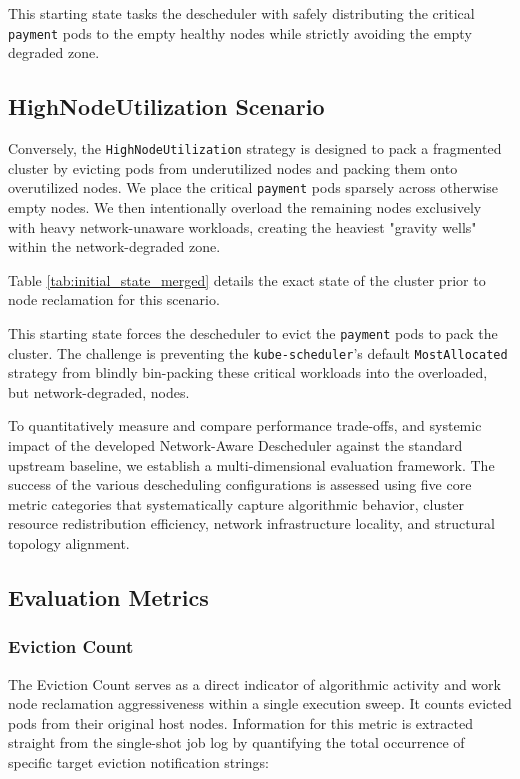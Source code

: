 This starting state tasks the descheduler with safely distributing the critical \texttt{payment} pods to the empty healthy nodes while strictly avoiding the empty degraded zone.


\subsection{HighNodeUtilization Scenario}
\label{subsubsec:netaware4_workload_highnode}

Conversely, the \texttt{HighNodeUtilization} strategy is designed to pack a fragmented cluster by evicting pods from underutilized nodes and packing them onto overutilized nodes. We place the critical \texttt{payment} pods sparsely across otherwise empty nodes. We then intentionally overload the remaining nodes exclusively with heavy network-unaware workloads, creating the heaviest "gravity wells" within the network-degraded zone.

Table \ref{tab:initial_state_merged} details the exact state of the cluster prior to node reclamation for this scenario.

This starting state forces the descheduler to evict the \texttt{payment} pods to pack the cluster. The challenge is preventing the \texttt{kube-scheduler}'s default \texttt{MostAllocated} strategy from blindly bin-packing these critical workloads into the overloaded, but network-degraded, nodes.



To quantitatively measure and compare performance trade-offs, and systemic impact of the developed Network-Aware Descheduler against the standard upstream baseline, we establish a multi-dimensional evaluation framework. The success of the various descheduling configurations is assessed using five core metric categories that systematically capture algorithmic behavior, cluster resource redistribution efficiency, network infrastructure locality, and structural topology alignment.


\subsection{Evaluation Metrics}
\label{subsec:netaware4_metrics}

\subsubsection{Eviction Count}
\label{subsubsec:netaware4_evaluationmetrics1}

The Eviction Count serves as a direct indicator of algorithmic activity and work node reclamation aggressiveness within a single execution sweep. It counts evicted pods from their original host nodes. Information for this metric is extracted straight from the single-shot job log by quantifying the total occurrence of specific target eviction notification strings:

